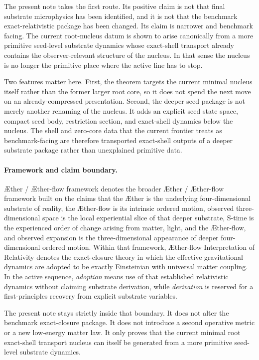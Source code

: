 \documentclass[11pt]{article}
\newcommand{\Aether}{\AE{}ther}
\newcommand{\Aflow}{\AE{}ther-flow}
\newcommand{\TheoryName}{\Aflow{} Interpretation of Relativity}
\newcommand{\TheoryProgram}{\Aether{} / \Aflow{} framework}
\begin{document}
The present note takes the first route. Its positive claim is not that final substrate microphysics has been identified, and it is not that the benchmark exact-relativistic package has been changed. Its claim is narrower and benchmark facing. The current root-nucleus datum is shown to arise canonically from a more primitive seed-level substrate dynamics whose exact-shell transport already contains the observer-relevant structure of the nucleus. In that sense the nucleus is no longer the primitive place where the active line has to stop.

Two features matter here. First, the theorem targets the current minimal nucleus itself rather than the former larger root core, so it does not spend the next move on an already-compressed presentation. Second, the deeper seed package is not merely another renaming of the nucleus. It adds an explicit seed state space, compact seed body, restriction section, and exact-shell dynamics below the nucleus. The shell and zero-core data that the current frontier treats as benchmark-facing are therefore transported exact-shell outputs of a deeper substrate package rather than unexplained primitive data.

\paragraph{Framework and claim boundary.}
\TheoryProgram{} denotes the broader \Aether{} / \Aflow{} framework built on the claims that the \Aether{} is the underlying four-dimensional substrate of reality, the \Aflow{} is its intrinsic ordered motion, observed three-dimensional space is the local experiential slice of that deeper substrate, S-time is the experienced order of change arising from matter, light, and the \Aflow{}, and observed expansion is the three-dimensional appearance of deeper four-dimensional ordered motion. Within that framework, \TheoryName{} denotes the exact-closure theory in which the effective gravitational dynamics are adopted to be exactly Einsteinian with universal matter coupling. In the active sequence, \emph{adoption} means use of that established relativistic dynamics without claiming substrate derivation, while \emph{derivation} is reserved for a first-principles recovery from explicit substrate variables.

The present note stays strictly inside that boundary. It does not alter the benchmark exact-closure package. It does not introduce a second operative metric or a new low-energy matter law. It only proves that the current minimal root exact-shell transport nucleus can itself be generated from a more primitive seed-level substrate dynamics.
\end{document}
